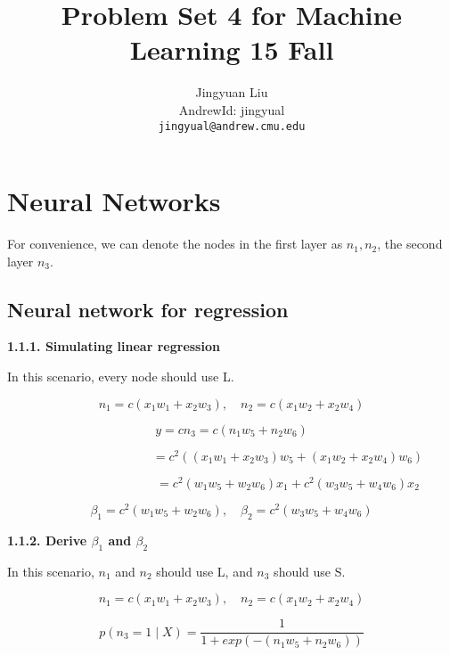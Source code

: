 \documentclass{article} %
\title{Problem Set 4 for Machine Learning 15 Fall}
\author{
Jingyuan Liu\\
AndrewId: jingyual\\
\texttt{jingyual@andrew.cmu.edu} \\
}
\begin{document}
\maketitle



\section{Neural Networks}


For convenience, we can denote the nodes in the first layer as $n_1, n_2$, the
second layer $n_3$.

\subsection{Neural network for regression}
\textbf{1.1.1. Simulating linear regression}

In this scenario, every node should use L.

\begin{equation}
n_1 = c(x_1 w_1 + x_2 w_3), \quad
n_2 = c(x_1 w_2 + x_2 w_4)
\end{equation}

\begin{equation}
y = c n_3 =  c(n_1 w_5 + n_2 w_6)
\end{equation}

\begin{equation}
\qquad \qquad \qquad \qquad \quad
= c^2 ((x_1 w_1 + x_2 w_3) w_5 + (x_1 w_2 + x_2 w_4) w_6)
\end{equation}

\begin{equation}
\qquad \qquad \qquad \qquad \quad
= c^2 (w_1 w_5 + w_2 w_6) x_1 + c^2 (w_3 w_5 + w_4 w_6) x_2
\end{equation}

\begin{equation}
\beta_1 = c^2 (w_1 w_5 + w_2 w_6),  \quad
\beta_2 = c^2 (w_3 w_5 + w_4 w_6)
\end{equation}

\textbf{1.1.2. Derive $\beta_1$ and $\beta_2$}

In this scenario, $n_1$ and $n_2$ should use L, and $n_3$ should use S.

\begin{equation}
n_1 = c(x_1 w_1 + x_2 w_3), \quad
n_2 = c(x_1 w_2 + x_2 w_4)
\end{equation}

\begin{equation}
p(n_3 = 1 \mid X) = \frac{1}{1 + exp(-(n_1 w_5 + n_2 w_6))}
\end{equation}
\end{document}
